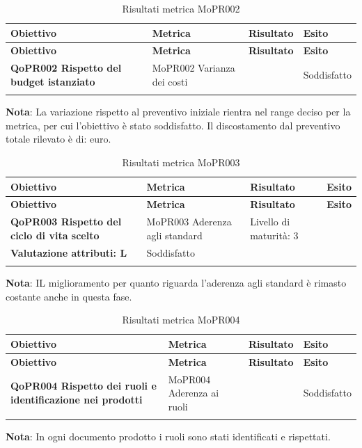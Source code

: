 \renewcommand{\arraystretch}{2} %
\begin{longtable}[H]{>{\centering\bfseries}m{5cm} >{\centering}m{5cm} >{\centering}m{2.5cm} >{\centering\arraybackslash}m{2.5cm}}  
  \rowcolor{lightgray}
  {\textbf{Obiettivo}} & {\textbf{Metrica}} & {\textbf{Risultato}} & {\textbf{Esito}}  \\
  \endfirsthead%
  \rowcolor{lightgray}
  {\textbf{Obiettivo}} & {\textbf{Metrica}} & {\textbf{Risultato}} & {\textbf{Esito}}  \\
  \endhead%
  \textbf{QoPR002 Rispetto del budget istanziato} & MoPR002 Varianza dei costi &  & Soddisfatto  \\
  \caption{Risultati metrica MoPR002}
  \label{tab:my-table}
\end{longtable}
\textbf{Nota}: La variazione rispetto al preventivo iniziale rientra nel range deciso per la metrica, per cui l'obiettivo è stato soddisfatto. Il discostamento dal preventivo totale rilevato è di:  euro.

\renewcommand{\arraystretch}{2} %
\begin{longtable}[H]{>{\centering\bfseries}m{5cm} >{\centering}m{5cm} >{\centering}m{2.5cm} >{\centering\arraybackslash}m{2.5cm}}  
  \rowcolor{lightgray}
  {\textbf{Obiettivo}} & {\textbf{Metrica}} & {\textbf{Risultato}} & {\textbf{Esito}}  \\
  \endfirsthead%
  \rowcolor{lightgray}
  {\textbf{Obiettivo}} & {\textbf{Metrica}} & {\textbf{Risultato}} & {\textbf{Esito}}  \\
  \endhead%
  \textbf{QoPR003 Rispetto del ciclo di vita scelto} & MoPR003 Aderenza agli standard & Livello di maturità: 3 \\ Valutazione attributi: L  &  Soddisfatto \\
  \caption{Risultati metrica MoPR003}
  \label{tab:my-table}
\end{longtable}
\textbf{Nota}: IL miglioramento per quanto riguarda l'aderenza agli standard è rimasto costante anche in questa fase.

\renewcommand{\arraystretch}{2} %
\begin{longtable}[H]{>{\centering\bfseries}m{5cm} >{\centering}m{5cm} >{\centering}m{2.5cm} >{\centering\arraybackslash}m{2.5cm}}  
  \rowcolor{lightgray}
  {\textbf{Obiettivo}} & {\textbf{Metrica}} & {\textbf{Risultato}} & {\textbf{Esito}}  \\
  \endfirsthead%
  \rowcolor{lightgray}
  {\textbf{Obiettivo}} & {\textbf{Metrica}} & {\textbf{Risultato}} & {\textbf{Esito}}  \\
  \endhead%
  \textbf{QoPR004 Rispetto dei ruoli e identificazione nei prodotti} & MoPR004 Aderenza ai ruoli & 0 & Soddisfatto \\
  \caption{Risultati metrica MoPR004}
  \label{tab:my-table}
\end{longtable}
\textbf{Nota}: In ogni documento prodotto i ruoli sono stati identificati e rispettati.


